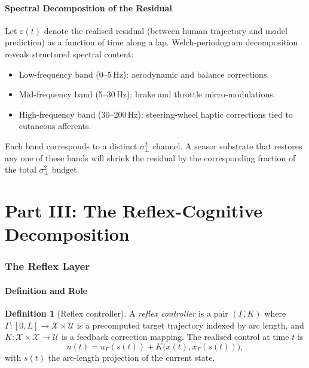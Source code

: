 \documentclass[11pt,twocolumn]{article}
\theoremstyle{definition}
\newtheorem{definition}[theorem]{Definition}
\theoremstyle{remark}
\newcommand{\cX}{\mathcal{X}}
\newcommand{\cU}{\mathcal{U}}
\begin{document}
\subsection{Spectral Decomposition of the Residual}

Let $\varepsilon(t)$ denote the realised residual (between human trajectory and model prediction) as a function of time along a lap. Welch-periodogram decomposition reveals structured spectral content:
\begin{itemize}[leftmargin=*,itemsep=2pt]
\item Low-frequency band (0--5\,Hz): aerodynamic and balance corrections.
\item Mid-frequency band (5--30\,Hz): brake and throttle micro-modulations.
\item High-frequency band (30--200\,Hz): steering-wheel haptic corrections tied to cutaneous afferents.
\end{itemize}

Each band corresponds to a distinct $\sigma^2_{\perp}$ channel. A sensor substrate that restores any one of these bands will shrink the residual by the corresponding fraction of the total $\sigma^2_{\perp}$ budget.

\bigskip

\part*{Part III: The Reflex-Cognitive Decomposition}

\section{The Reflex Layer}
\label{sec:reflex-arch}

\subsection{Definition and Role}

\begin{definition}[Reflex controller]\label{def:reflex}
A \emph{reflex controller} is a pair $(\Gamma, K)$ where $\Gamma: [0, L] \to \cX \times \cU$ is a precomputed target trajectory indexed by arc length, and $K: \cX \times \cX \to \cU$ is a feedback correction mapping. The realised control at time $t$ is
\begin{equation}
u(t) = u_{\Gamma}(s(t)) + K\big(x(t), x_{\Gamma}(s(t))\big),
\end{equation}
with $s(t)$ the arc-length projection of the current state.
\end{definition}
\end{document}
